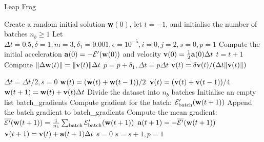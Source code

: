 \documentclass[10pt, conference]{IEEEtran}
\begin{document}
\begin{algorithm}[H]
    \caption{Leap Frog}
    \label{alg:LeapFrog_improved_algorithm}
    \begin{algorithmic}[1]
        \State Create a random initial solution \textbf{w}$(0)$, let $t = -1$, and initialise the number of batches $n_b \geq 1$
        \State Let $\Delta t = 0.5, \delta = 1, m = 3, \delta_1 = 0.001, \epsilon = 10^{-5}, i = 0, j = 2, s = 0, p = 1$
        \State Compute the initial acceleration \textbf{a}$(0) = -\mathcal{E}'(\text{\textbf{w}}(0))$ and velocity
                \textbf{v}$(0) = \frac{1}{2}\text{\textbf{a}}(0)\Delta t$
        \Repeat
            \State $t = t + 1$
            \State Compute $\| \Delta \text{\textbf{w}}(t) \| = \|\text{\textbf{v}}(t) \| \Delta t$
                \State $p = p + \delta_1, \Delta t = p \Delta t$
            \Else
                \State \textbf{v}$(t) = \delta \text{\textbf{v}}(t)/(\Delta t \| \text{\textbf{v}}(t) \|)$
            \EndIf

                \State $\Delta t = \Delta t / 2, s = 0$
                \State \textbf{w}$(t) = (\text{\textbf{w}}(t) + \text{\textbf{w}}(t-1))/2$
                \State $\text{\textbf{v}}(t) = (\text{\textbf{v}}(t) + \text{\textbf{v}}(t-1))/4$
            \EndIf
            \State $\text{\textbf{w}}(t+1) = \text{\textbf{w}}(t) + \text{\textbf{v}}(t) \Delta t$
            \Repeat
                \State Divide the dataset into $n_b$ batches
                \State Initialise an empty list batch\_gradients
                    \State Compute gradient for the batch: $\mathcal{E}'_{\text{batch}}(\text{\textbf{w}}(t+1))$
                    \State Append the batch gradient to batch\_gradients
                \EndFor
                \State Compute the mean gradient: $\overline{\mathcal{E}'}(\text{\textbf{w}}(t+1)) = \frac{1}{n_b}\sum_{\text{batch}} \mathcal{E}'_{\text{batch}}(\text{\textbf{w}}(t+1))$
                \State $\text{\textbf{a}}(t+1) = -\overline{\mathcal{E}'}(\text{\textbf{w}}(t+1))$
                \State $\text{\textbf{v}}(t+1) = \text{\textbf{v}}(t) + \text{\textbf{a}}(t+1) \Delta t$
                    \State $s = 0$
                \Else
                    \State $s = s + 1, p = 1$
                \EndIf


\end{algorithmic}
\end{algorithm}
\end{document}
